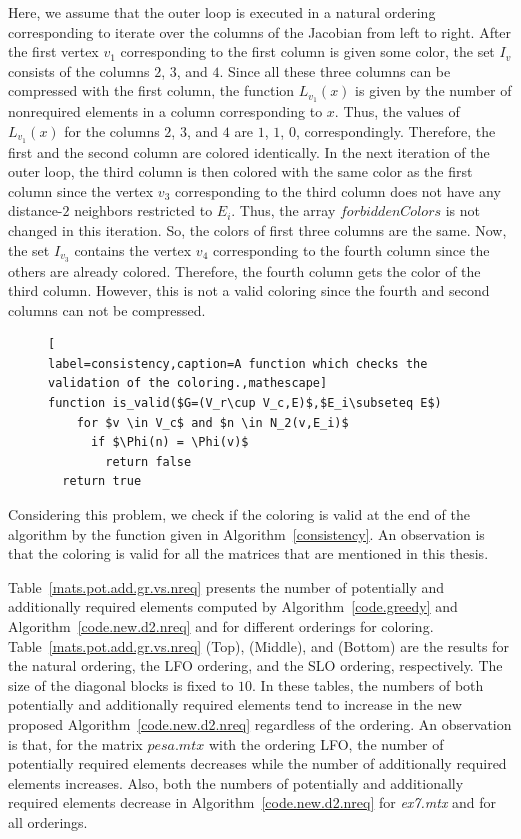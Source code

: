 \documentclass[12pt, twoside,a4paper,toc=bibliography]{scrbook}
\newcommand{\coderef}[1]{Algorithm~\protect\ref{#1}}
\newcommand{\nreq}{L}
\begin{document}
Here, we assume that the outer loop is executed in a natural ordering corresponding to iterate over
the columns of the Jacobian from left to right.
After the first vertex $v_1$ corresponding to the first column is given some color,
the set $I_v$ consists of the columns $2$, $3$, and $4$. Since all these three columns
can be compressed with the first column, the function $\nreq_{v_1}(x)$ is given by the number of
nonrequired elements in a column corresponding to $x$. Thus, the values of $\nreq_{v_1}(x)$
for the columns $2$, $3$, and $4$ are $1$, $1$, $0$, correspondingly.
Therefore, the first and the second column are colored identically.
In the next iteration of the outer loop, the third column is then colored with the same color as the first
column since the vertex $v_3$ corresponding to the third column does not have any distance-$2$ neighbors
restricted to $E_i$. Thus, the array $forbiddenColors$ is not changed in this iteration.
So, the colors of first three columns are the same.
Now, the set $I_{v_3}$ contains the vertex $v_4$ corresponding to the
fourth column since the others are already colored. Therefore, the fourth column gets the color of
the third column. However, this is not a valid coloring since the fourth and second columns can not be compressed.
\begin{figure}
\begin{lstlisting}[
label=consistency,caption=A function which checks the validation of the coloring.,mathescape]
function is_valid($G=(V_r\cup V_c,E)$,$E_i\subseteq E$)
    for $v \in V_c$ and $n \in N_2(v,E_i)$
      if $\Phi(n) = \Phi(v)$
        return false
  return true
\end{lstlisting}
\end{figure}
Considering this problem, we check if the coloring is valid at the end of the algorithm
by the function given in \coderef{consistency}.
An observation is that the coloring is valid for all the matrices that are mentioned in this
thesis.

Table~\ref{mats.pot.add.gr.vs.nreq} presents the number of potentially
and additionally required elements computed
by \coderef{code.greedy} and \coderef{code.new.d2.nreq}
and for different orderings for coloring.
Table~\ref{mats.pot.add.gr.vs.nreq} (Top), (Middle), and (Bottom) are
the results for the natural ordering, the LFO ordering, and the SLO ordering, respectively.
The size of the diagonal blocks is fixed to $10$.
In these tables, the numbers of both potentially and additionally required elements
tend to increase in the new proposed \coderef{code.new.d2.nreq} regardless of the ordering.
An observation is that, for the matrix $pesa.mtx$ with the ordering LFO,
the number of potentially required elements decreases
while the number of additionally required elements increases. Also,
both the numbers of potentially and additionally required elements
decrease in \coderef{code.new.d2.nreq} for \textit{ex7.mtx} and for all orderings.
\end{document}
